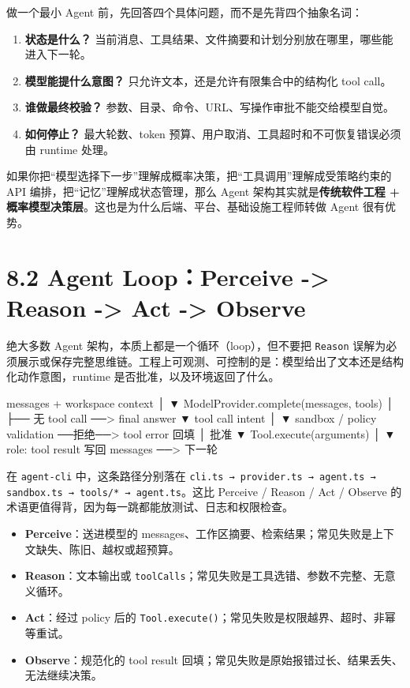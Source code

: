 做一个最小 Agent 前，先回答四个具体问题，而不是先背四个抽象名词：
\begin{enumerate}[leftmargin=2em]
\item \textbf{状态是什么？} 当前消息、工具结果、文件摘要和计划分别放在哪里，哪些能进入下一轮。
\item \textbf{模型能提什么意图？} 只允许文本，还是允许有限集合中的结构化 tool call。
\item \textbf{谁做最终校验？} 参数、目录、命令、URL、写操作审批不能交给模型自觉。
\item \textbf{如何停止？} 最大轮数、token 预算、用户取消、工具超时和不可恢复错误必须由 runtime 处理。
\end{enumerate}

如果你把``模型选择下一步''理解成概率决策，把``工具调用''理解成受策略约束的 API 编排，把``记忆''理解成状态管理，那么 Agent 架构其实就是\textbf{传统软件工程 + 概率模型决策层}。这也是为什么后端、平台、基础设施工程师转做 Agent 很有优势。


\section{8.2 Agent Loop：Perceive -> Reason -> Act -> Observe}

绝大多数 Agent 架构，本质上都是一个循环（loop），但不要把 \texttt{Reason} 误解为必须展示或保存完整思维链。工程上可观测、可控制的是：模型给出了文本还是结构化动作意图，runtime 是否批准，以及环境返回了什么。


\begin{codeblock}
messages + workspace context
            │
            ▼
    ModelProvider.complete(messages, tools)
            │
            ├── 无 tool call ──> final answer
            ▼
      tool call intent
            │
            ▼
 sandbox / policy validation ──拒绝──> tool error 回填
            │ 批准
            ▼
 Tool.execute(arguments)
            │
            ▼
 role: tool result 写回 messages ──> 下一轮
\end{codeblock}

在 \texttt{agent-cli} 中，这条路径分别落在 \texttt{cli.ts → provider.ts → agent.ts → sandbox.ts → tools/* → agent.ts}。这比 Perceive / Reason / Act / Observe 的术语更值得背，因为每一跳都能放测试、日志和权限检查。

\begin{itemize}[leftmargin=2em]
\item \textbf{Perceive}：送进模型的 messages、工作区摘要、检索结果；常见失败是上下文缺失、陈旧、越权或超预算。
\item \textbf{Reason}：文本输出或 \texttt{toolCalls}；常见失败是工具选错、参数不完整、无意义循环。
\item \textbf{Act}：经过 policy 后的 \texttt{Tool.execute()}；常见失败是权限越界、超时、非幂等重试。
\item \textbf{Observe}：规范化的 tool result 回填；常见失败是原始报错过长、结果丢失、无法继续决策。
\end{itemize}

